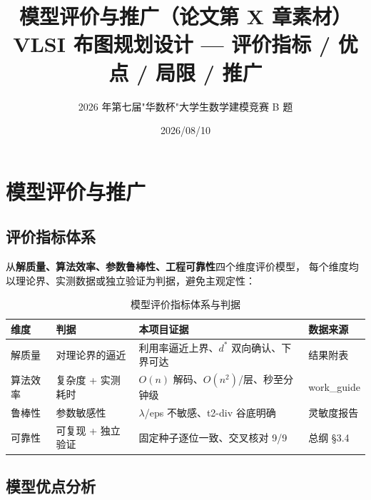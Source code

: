 \documentclass[12pt,a4paper]{article}
\title{\textbf{模型评价与推广（论文第 X 章素材）}\\[6pt]
\large VLSI 布图规划设计 --- 评价指标 / 优点 / 局限 / 推广}
\author{2026 年第七届"华数杯"大学生数学建模竞赛 B 题}
\date{2026/08/10}
\begin{document}
\maketitle

\section{模型评价与推广}

\subsection{评价指标体系}

从\textbf{解质量、算法效率、参数鲁棒性、工程可靠性}四个维度评价模型，
每个维度均以理论界、实测数据或独立验证为判据，避免主观定性：

\begin{table}[H]
\centering
\scriptsize
\setlength{\tabcolsep}{2.5pt}
\caption{模型评价指标体系与判据}
\begin{tabular}{llll}
\toprule
维度 & 判据 & 本项目证据 & 数据来源 \\
\midrule
解质量 & 对理论界的逼近 & 利用率逼近上界、$d^*$ 双向确认、下界可达 & 结果附表 \\
算法效率 & 复杂度 + 实测耗时 & $O(n)$ 解码、$O(n^2)$/层、秒至分钟级 & work\_guide \\
鲁棒性 & 参数敏感性 & $\lambda$/eps 不敏感、t2-div 谷底明确 & 灵敏度报告 \\
可靠性 & 可复现 + 独立验证 & 固定种子逐位一致、交叉核对 9/9 & 总纲 §3.4 \\
\bottomrule
\end{tabular}
\end{table}

\subsection{模型优点分析}
\end{document}
